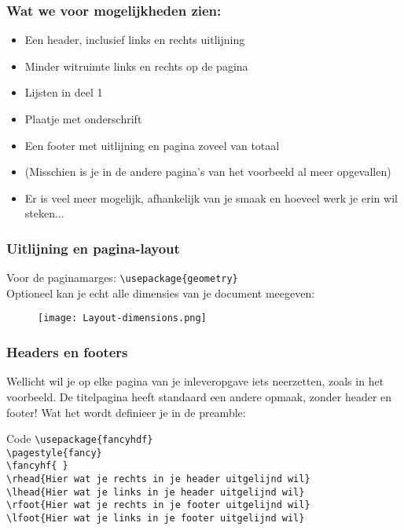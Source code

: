 \documentclass{beamer}
\begin{document}
\begin{frame}
	\frametitle{Wat we voor mogelijkheden zien:}
	\begin{itemize}
		\item Een header, inclusief links en rechts uitlijning
		\item Minder witruimte links en rechts op de pagina
		\item Lijsten in deel 1
		\item Plaatje met onderschrift
		\item Een footer met uitlijning en pagina zoveel van totaal
		\item (Misschien is je in de andere pagina's van het voorbeeld al meer opgevallen)
		\item Er is veel meer mogelijk, afhankelijk van je smaak en hoeveel werk je erin wil steken...
	\end{itemize}
\end{frame}

\begin{frame}
	\frametitle{Uitlijning en pagina-layout}
	Voor de paginamarges: \texttt{\textbackslash usepackage\{geometry\} }\\
	Optioneel kan je echt alle dimensies van je document meegeven:
	\begin{figure}
			\texttt{[image: Layout-dimensions.png]}
	\end{figure}
\end{frame}

\begin{frame}
	\frametitle{Headers en footers}
	Wellicht wil je op elke pagina van je inleveropgave iets neerzetten, zoals in het voorbeeld. De titelpagina heeft standaard een andere opmaak, zonder header en footer! Wat het wordt definieer je in de preamble:
	\begin{block}{Code}
		\texttt{\textbackslash usepackage\{fancyhdf\}}\\
		\texttt{\textbackslash pagestyle\{fancy\}}\\
		\texttt{\textbackslash fancyhf\{ \}}\\
		\texttt{\textbackslash rhead\{{\textnormal{Hier wat je rechts in je header uitgelijnd wil}}\}}\\
		\texttt{\textbackslash lhead\{{\textnormal{Hier wat je links in je header uitgelijnd wil}}\}}\\
		\texttt{\textbackslash rfoot\{{\textnormal{Hier wat je rechts in je footer uitgelijnd wil}}\}}\\
		\texttt{\textbackslash lfoot\{{\textnormal{Hier wat je links in je footer uitgelijnd wil}}\}}
	\end{block}
\end{frame}
\end{document}
